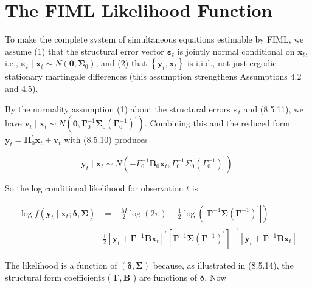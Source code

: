 \documentclass[10pt]{article}
\begin{document}
\section*{The FIML Likelihood Function}
To make the complete system of simultaneous equations estimable by FIML, we assume (1) that the structural error vector $\boldsymbol{\varepsilon}_{t}$ is jointly normal conditional on $\mathbf{x}_{t}$, i.e., $\boldsymbol{\varepsilon}_{t} \mid \mathbf{x}_{t} \sim N\left(\mathbf{0}, \boldsymbol{\Sigma}_{0}\right)$, and (2) that $\left\{\mathbf{y}_{t}, \mathbf{x}_{t}\right\}$ is i.i.d., not just ergodic stationary martingale differences (this assumption strengthens Assumptions 4.2 and 4.5).

By the normality assumption (1) about the structural errors $\boldsymbol{\varepsilon}_{t}$ and (8.5.11), we have $\mathbf{v}_{t} \mid \mathbf{x}_{t} \sim N\left(\mathbf{0}, \boldsymbol{\Gamma}_{0}^{-1} \boldsymbol{\Sigma}_{0}\left(\boldsymbol{\Gamma}_{0}^{-1}\right)^{\prime}\right)$. Combining this and the reduced form $\mathbf{y}_{t}=\boldsymbol{\Pi}_{0}^{\prime} \mathbf{x}_{t}+\mathbf{v}_{t}$ with (8.5.10) produces


\begin{equation*}
\mathbf{y}_{t} \mid \mathbf{x}_{t} \sim N\left(-\Gamma_{0}^{-1} \mathbf{B}_{0} \mathbf{x}_{t}, \Gamma_{0}^{-1} \Sigma_{0}\left(\Gamma_{0}^{-1}\right)^{\prime}\right) . \tag{8.5.15}
\end{equation*}


So the log conditional likelihood for observation $t$ is


\begin{align*}
\log f\left(\mathbf{y}_{t} \mid \mathbf{x}_{t} ; \boldsymbol{\delta}, \boldsymbol{\Sigma}\right) & =-\frac{M}{2} \log (2 \pi)-\frac{1}{2} \log \left(\left|\boldsymbol{\Gamma}^{-1} \boldsymbol{\Sigma}\left(\boldsymbol{\Gamma}^{-1}\right)^{\prime}\right|\right) \\
- & \frac{1}{2}\left[\mathbf{y}_{t}+\boldsymbol{\Gamma}^{-1} \mathbf{B} \mathbf{x}_{t}\right]^{\prime}\left[\boldsymbol{\Gamma}^{-1} \boldsymbol{\Sigma}\left(\boldsymbol{\Gamma}^{-1}\right)^{\prime}\right]^{-1}\left[\mathbf{y}_{t}+\boldsymbol{\Gamma}^{-1} \mathbf{B} \mathbf{x}_{t}\right] \tag{8.5.16}
\end{align*}


The likelihood is a function of $(\boldsymbol{\delta}, \boldsymbol{\Sigma})$ because, as illustrated in (8.5.14), the structural form coefficients ( $\boldsymbol{\Gamma}, \mathbf{B}$ ) are functions of $\boldsymbol{\delta}$. Now
\end{document}
